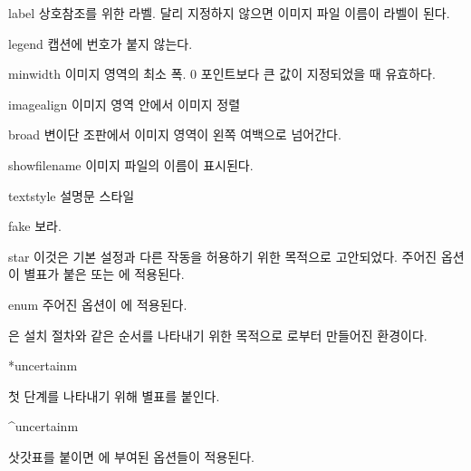 \documentclass[pairquote, minted]{hzguide}
\begin{document}
\begin{macros}
\item[label] 
상호참조를 위한 라벨. 달리 지정하지 않으면 이미지 파일 이름이 라벨이 된다.

\item[legend] \keyvalueTF
캡션에 번호가 붙지 않는다.

\item[minwidth] \keyvalue{0pt}
이미지 영역의 최소 폭. 0 포인트보다 큰 값이 지정되었을 때 유효하다.

\item[imagealign] \keyvalue{\raggedright, \centering, \raggedleft}
이미지 영역 안에서 이미지 정렬

\item[broad] \keyvalueTF
변이단 조판에서 이미지 영역이 왼쪽 여백으로 넘어간다.

\item[showfilename]  \keyvalueTF
이미지 파일의 이름이 표시된다.

\item[textstyle] \keyvalue{\raggedright\small}
설명문 스타일 

\item[fake] \keyvalueTF
{}\를 보라.

\item[star] 
이것은 기본 설정과 다른 작동을 허용하기 위한 목적으로 고안되었다.
주어진 옵션이 별표가 붙은 \macro{\illustimage*} 또는 \macro{\begin{IllustImage}*} 에 적용된다. 

\item[enum] 
주어진 옵션이 \macro{\begin{IllustEnum}} 에 적용된다. 
\end{macros}

은 설치 절차와 같은 순서를 나타내기 위한 목적으로 로부터 만들어진 환경이다.

\begin{coderesult}
\begin{IllustEnum}*{uncertainm}
    \item 첫 단계를 나타내기 위해 별표를 붙인다.
\end{IllustEnum}
\begin{IllustEnum}^{uncertainm}
    \item 삿갓표를 붙이면 에 부여된 옵션들이 적용된다.
\end{IllustEnum}
\end{coderesult}
\end{document}
